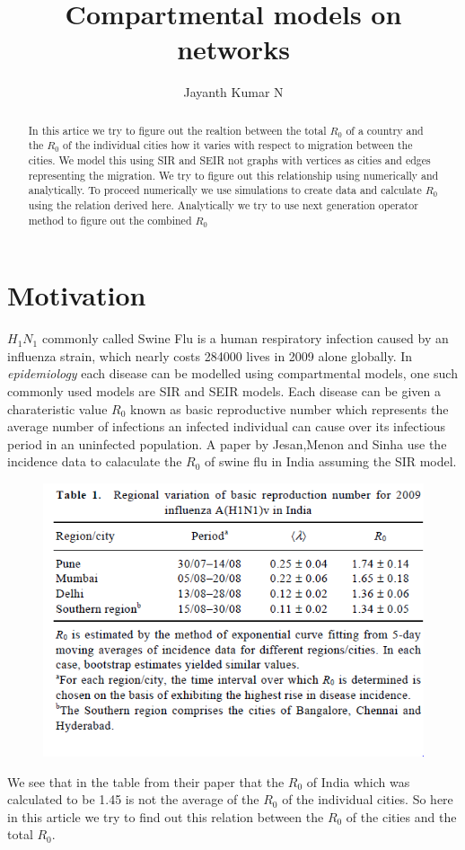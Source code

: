\documentclass{article}
\begin{document}
\author{Jayanth Kumar N}
\title{\textbf{Compartmental models on networks}}
\maketitle

\begin{abstract}
   In this artice we try to figure out the realtion between the total
   $R_{0}$ of a country and the $R_{0}$ of the individual cities how
   it varies with respect to migration between the cities. We model
   this using SIR and SEIR not graphs with vertices as cities and
   edges representing the migration. We try to figure out this
   relationship using numerically and analytically. To proceed
   numerically we use simulations to create data and calculate $R_{0}$
   using the relation derived here. Analytically we try to use next
   generation operator method to figure out the combined $R_{0}$
\end{abstract}

\section{Motivation}
$H_{1}N_{1}$ commonly called Swine Flu is a human respiratory
infection caused by an influenza strain, which nearly costs 284000
lives in 2009 alone globally. In \textit{epidemiology} each disease
can be modelled using compartmental models, one such commonly used
models are SIR and SEIR models. Each disease can be given a
charateristic value $R_{0}$ known as basic reproductive number which
represents the average number of infections an infected individual can
cause over its infectious period in an uninfected population. A paper
by Jesan,Menon and Sinha use the incidence data to calaculate the
$R_{0}$ of swine flu in India assuming the SIR model.
\begin{figure}[h]
  \centering
\includegraphics[scale=0.5]{table1}
\end{figure}
We see that in the table from their paper that the $R_{0}$ of India
which was calculated to be 1.45 is not the average of the $R_{0}$ of
the individual cities. So here in this article we try to find out this
relation between the $R_{0}$ of the cities and the total $R_{0}$.
\end{document}
